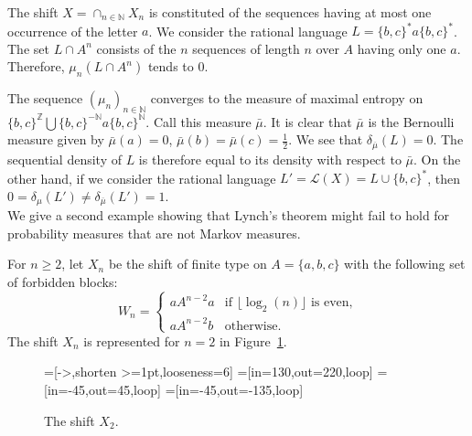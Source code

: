 \documentclass{article}[11pt]
\newcommand\cL{\mathcal{L}}
\newcommand{\N}{\mathbb{N}}
\newcommand{\Z}{\mathbb{Z}}
\numberwithin{theorem}{section}
\numberwithin{equation}{section}
\numberwithin{figure}{section}
\numberwithin{table}{section}
\begin{document}
The shift $X=\cap_{n\in \N} X_n$ is
constituted of the sequences
having at most one occurrence
of the letter $a$. 
We consider the rational language $L=\{b,c\}^*a\{b,c\}^*$.
The set  $L\cap A^n$ consists of the $n$ sequences of
length $n$ over $A$ having only one $a$. Therefore, $\mu_n(L\cap A^n)$
tends to $0$.

The sequence $(\mu_n)_{n \in \N}$ converges to the measure of maximal entropy on $\{b,c\}^{\Z} \bigcup \{b,c\}^{-\N}a\{b,c\}^{\N}$. Call this measure $\bar{\mu}$.
It is clear that $\bar{\mu}$ is
the Bernoulli measure given by $\bar{\mu}(a)=0$,
$\bar{\mu}(b)=
\bar{\mu}(c)=\frac{1}{2}$.
We see that $\delta_{\overline{\mu}}(L)=0$.
The sequential density of $L$
is therefore equal to its density with respect to $\bar{\mu}$.
On the other hand, if we consider the
rational language $L'=\cL(X)=L\cup\{b,c\}^*$,
then $0=\delta_\mu(L')\ne\delta_{\overline{\mu}}(L')=1$.\\

We give a second example showing that Lynch's theorem might fail to hold
for  probability measures that are not Markov  measures.

For $n\ge 2$, let $X_n$ be  the shift of finite type on $A=\{a,b,c\}$ with the following set of forbidden blocks:
\[W_n=\begin{cases}aA^{n-2}a&\mbox{if $\lfloor \log_2(n)\rfloor$ is even,}\\
aA^{n-2}b&\mbox{otherwise.}\end{cases}\]
The shift $X_n$ is represented for $n=2$ in Figure~\ref{figureShiftXn}.
\begin{figure}[hbt]
\centering
{}
    =[->,shorten >=1pt,looseness=6]
    =[in=130,out=220,loop]
    =[in=-45,out=45,loop]
    =[in=-45,out=-135,loop]
\caption{The shift $X_2$.}\label{figureShiftXn}
\end{figure}
\end{document}
